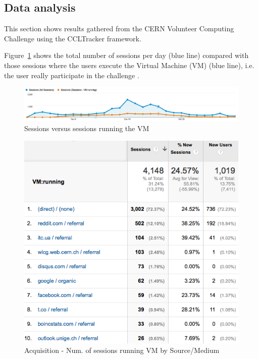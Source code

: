 \documentclass{article}
\begin{document}
\subsection{Data analysis}

This section shows results gathered from the CERN Volunteer Computing Challenge using the CCLTracker framework. 

Figure~\ref{img:Sessions versus sessions running the VM} shows the total number of sessions per day (blue line) compared with those sessions where the users execute the Virtual Machine (VM) (blue line), i.e. the user really participate in the challenge . 






\begin{figure}[t]
  \begin{center}
		\includegraphics[width=15cm]{imgs/sessionVSsessionVMRunning.png}
  \end{center}
\caption{Sessions versus sessions running the VM}
\label{img:Sessions versus sessions running the VM}
\end{figure}

      
    
    
    
      
      
\begin{figure}[t]
  \begin{center}
		\includegraphics[width=\columnwidth]{imgs/sourceMediumVMRunning.png}
  \end{center}
\caption{Acquisition - Num. of sessions running VM by Source/Medium}
\label{img:AcquisitionRunningVM}
\end{figure}      
      
\end{document}
